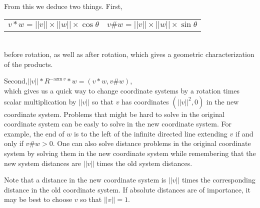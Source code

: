 \documentclass[12pt]{article}
\begin{document}
From this we deduce two things.  First, \\
\hspace*{0.5in}
    \begin{tabular}{l@{~~~~~}l}
    $v*w=||v||\times||w||\times\cos\theta$ &
    $v\#w=||v||\times||w||\times\sin\theta$ \\
    \end{tabular} \\
before rotation, as well as after rotation,
which gives a geometric characterization of the products.

Second,\hspace{0.5in}$||v||*R^{-\mathrm{azm}~v}*w=(v*w,v\#w)$,
\\[1ex]
which gives us a quick way to change coordinate systems
by a rotation times scalar multiplication by $||v||$ so that
$v$ has coordinates $(||v||^2,0)$ in the new coordinate system.
Problems that might be hard to solve in the original
coordinate system can be easly to solve in the new coordinate
system.  For example, the end of $w$ is to the left of the infinite directed
line extending $v$ if and only if $v\#w>0$.  One can also solve
distance problems in the original coordinate system by solving them
in the new coordinate system while remembering that the new system distances
are $||v||$ times the old system distances.

Note that a distance in
the new coordinate system is $||v||$ times the corresponding
distance in the old coordinate system.  If absolute distances are
of importance, it may be best to choose $v$ so that $||v||=1$.

\bigskip
\end{document}
